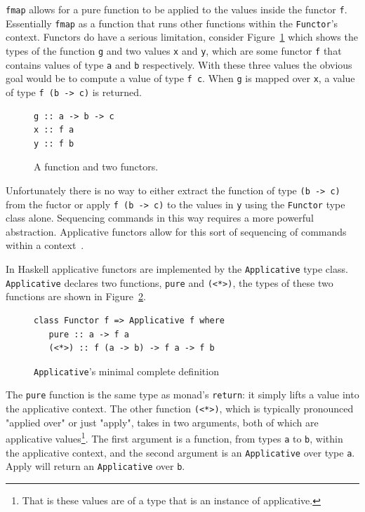\texttt{fmap} allows for a pure function to be applied to the values inside the functor \texttt{f}. Essentially \texttt{fmap} as a function that runs other functions within the \texttt{Functor}'s context. Functors do have a serious limitation, consider Figure~\ref{gxy} which shows the types of the function \texttt{g} and two values \texttt{x} and \texttt{y}, which are some functor \texttt{f} that contains values of type \texttt{a} and \texttt{b} respectively. With these three values the obvious goal would be to compute a value of type \texttt{f c}. When \texttt{g} is mapped over   \texttt{x}, a value of type \texttt{f (b -> c)} is returned.

\begin{figure}[t]
\begin{lstlisting}
g :: a -> b -> c
x :: f a
y :: f b
\end{lstlisting}
\caption{A function and two functors.}
\label{gxy}
\end{figure}

Unfortunately there is no way to either extract the function of type \texttt{(b -> c)} from the fuctor or apply \texttt{f (b -> c)} to the values in \texttt{y} using the \texttt{Functor} type class alone. Sequencing commands in this way requires a more powerful abstraction. Applicative functors allow for this sort of sequencing of commands within a context~\citep{realWorldHaskell}. 

In Haskell applicative functors are implemented by the \texttt{Applicative} type class. \texttt{Applicative} declares two functions, \texttt{pure} and \texttt{(<*>)}, the types of these two functions are shown in Figure~\ref{appTypes}. 

\begin{figure}[t]
\begin{lstlisting}
class Functor f => Applicative f where
   pure :: a -> f a
   (<*>) :: f (a -> b) -> f a -> f b
\end{lstlisting}
\caption{\texttt{Applicative}'s minimal complete definition}
\label{appTypes}
\end{figure}

The \texttt{pure} function is the same type as monad's \texttt{return}: it simply lifts a value into the applicative context. The other function \texttt{(<*>)}, which is typically pronounced "applied over" or just "apply", takes in two arguments, both of which are applicative values\footnote{That is these values are of a type that is an instance of applicative.}. The first argument is a function, from types \texttt{a} to \texttt{b}, within the applicative context, and the second argument is an \texttt{Applicative} over type \texttt{a}. Apply will return an \texttt{Applicative} over \texttt{b}.

